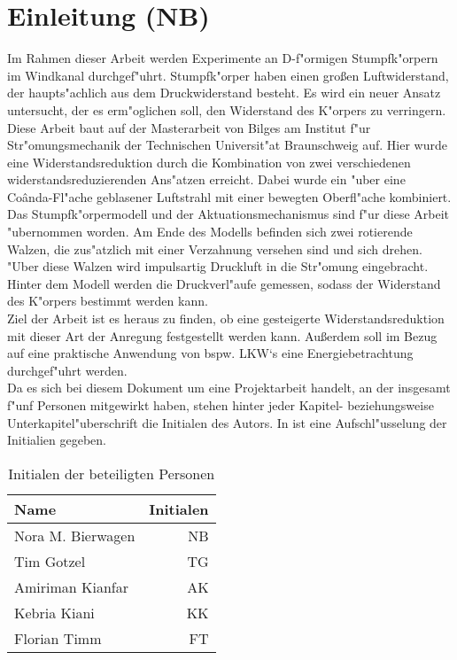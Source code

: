 \chapter{Einleitung (NB)}\label{s:einleitung}
Im Rahmen dieser Arbeit werden Experimente an D-f"ormigen Stumpfk"orpern im Windkanal durchgef"uhrt. Stumpfk"orper haben einen gro\ss{}en Luftwiderstand, der haupts"achlich aus dem Druckwiderstand besteht. Es wird ein neuer Ansatz untersucht, der es erm"oglichen soll, den Widerstand des K"orpers zu verringern.\\
Diese Arbeit baut auf der Masterarbeit von Bilges \cite{Bilges.2018} am Institut f"ur Str"omungsmechanik der Technischen Universit"at Braunschweig auf. Hier wurde eine Widerstandsreduktion durch die Kombination von zwei verschiedenen widerstandsreduzierenden Ans"atzen erreicht. Dabei wurde ein "uber eine Co\^{a}nda-Fl"ache geblasener Luftstrahl mit einer bewegten Oberfl"ache kombiniert. Das Stumpfk"orpermodell und der Aktuationsmechanismus sind f"ur diese Arbeit "ubernommen worden. Am Ende des Modells befinden sich zwei rotierende Walzen, die zus"atzlich mit einer Verzahnung versehen sind und sich drehen. "Uber diese Walzen wird impulsartig Druckluft in die Str"omung eingebracht. Hinter dem Modell werden die Druckverl"aufe gemessen, sodass der Widerstand des K"orpers bestimmt werden kann.\\
Ziel der Arbeit ist es heraus zu finden, ob eine gesteigerte Widerstandsreduktion mit dieser Art der Anregung festgestellt werden kann. Au\ss{}erdem soll im Bezug auf eine praktische Anwendung von bspw. LKW`s eine Energiebetrachtung durchgef"uhrt werden.\\
Da es sich bei diesem Dokument um eine Projektarbeit handelt, an der insgesamt f"unf Personen mitgewirkt haben, stehen hinter jeder Kapitel- beziehungsweise Unterkapitel"uberschrift die Initialen des Autors. In  ist eine Aufschl"usselung der Initialien gegeben.

\begin{table}[h]
	\centering
	\begin{tabular}{lr}
		\toprule
		Name & Initialen\\
		\midrule
		Nora M. Bierwagen & NB\\
		Tim Gotzel & TG\\
		Amiriman Kianfar & AK\\
		Kebria Kiani & KK\\
		Florian Timm & FT\\
		\bottomrule
	\end{tabular}
	\caption{Initialen der beteiligten Personen}
	\label{tab:initialien}
\end{table}
